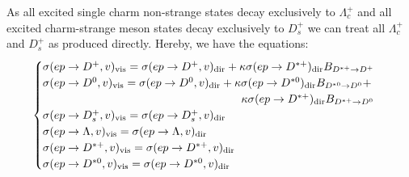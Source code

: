 \begin{appendices}
As all excited single charm non-strange states decay exclusively to 
$\Lambda_c^+$ and all excited charm-strange meson  states decay 
exclusively to $D^{+}_s$ we can treat all 
$\Lambda_c^{+}$ and  $D^{+}_s$ as produced directly. Hereby, we have the
equations: 
$$
\begin{cases}
\sigma(ep\rightarrow D^+, v)_{\text{vis}}  =
\sigma(ep\rightarrow  D^+, v)_{\text{dir}}+\kappa \sigma(ep\rightarrow  
D^{*+})_{\text{dir}}B_{D^{*+} \rightarrow D^+}\\
\sigma(ep\rightarrow D^0, v)_{\text{vis}}  =\sigma(ep\rightarrow  D^0, 
v)_{\text{dir}}
+\kappa \sigma(ep\rightarrow  D^{*0})_{\text{dir}}B_{D^{*0} \rightarrow 
D^0}+\\
\hfill                                                                  
\kappa\sigma(ep\rightarrow  D^{*+})_{\text{dir}}B_{D^{*+}\rightarrow 
D^0}\\
\sigma(ep\rightarrow D^+_s,v)_{\text{vis}}=
\sigma(ep\rightarrow  D^+_s,v)_{\text{dir}}\\
\sigma(ep\rightarrow \Lambda, v)_{\text{vis}}=
\sigma(ep\rightarrow  \Lambda, v)_{\text{dir}}\\
\sigma(ep\rightarrow D^{*+}, v)_{\text{vis}}=
\sigma(ep\rightarrow  D^{*+}, v)_{\text{dir}}\\
\sigma(ep\rightarrow D^{*0}, v)_{\text{vis}}=
\sigma(ep\rightarrow  D^{*0}, v)_{\text{dir}}
\end{cases}
$$


\end{appendices}
